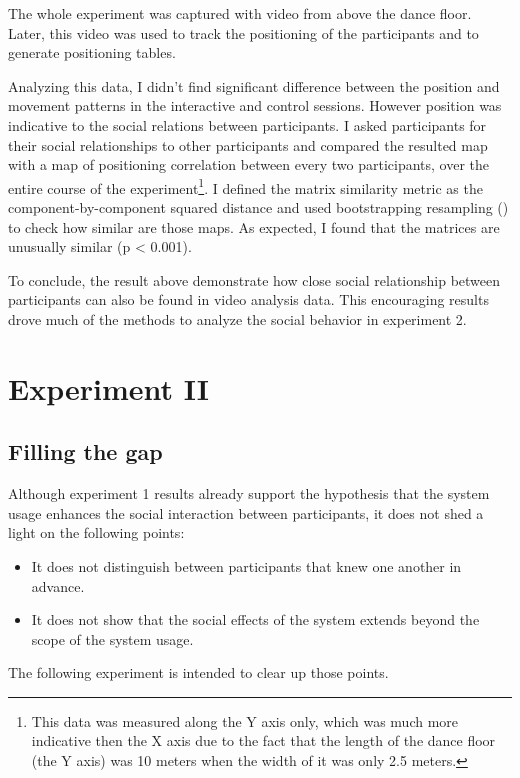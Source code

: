 \documentclass[a4paper,11pt]{article}
\begin{document}
{The whole experiment was captured with video from above the dance floor.
Later, this video was used to track the positioning of the participants and to generate positioning tables.

Analyzing this data, I didn't find significant difference between the position and movement patterns in the interactive and control sessions.
However position was indicative to the social relations between participants.
I asked participants for their social relationships to other participants and compared the resulted map with a map of positioning correlation between every two participants, over the entire course of the experiment\footnote{This data was measured along the Y axis only, which was much more indicative then the X axis due to the fact that the length of the dance floor (the Y axis) was 10 meters when the width of it was only 2.5 meters.}.
I defined the matrix similarity metric as the component-by-component squared distance and used bootstrapping resampling (\cite{good2006permutation}) to check how similar are those maps.
As expected, I found that the matrices are unusually similar (p \textless{} 0.001).

To conclude, the result above demonstrate how close social relationship between participants can also be found in video analysis data.
This encouraging results drove much of the methods to analyze the social behavior in experiment 2.

\section{Experiment II}

\subsection{Filling the gap}

Although experiment 1 results already support the hypothesis that the system usage enhances the social interaction between participants, it does not shed a light on the following points:

\begin{itemize}
	\item It does not distinguish between participants that knew one another in advance.
	\item It does not show that the social effects of the system extends beyond the scope of the system usage.
\end{itemize}

The following experiment is intended to clear up those points.

}
\end{document}

